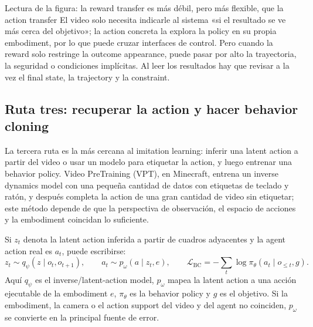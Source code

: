 
\begin{knowledgebox}{Lectura de la figura: la reward transfer es más débil, pero más flexible, que la action transfer}
El video solo necesita indicarle al sistema «si el resultado se ve más cerca del objetivo»; la action concreta la explora la policy en su propia embodiment, por lo que puede cruzar interfaces de control. Pero cuando la reward solo restringe la outcome appearance, puede pasar por alto la trayectoria, la seguridad o condiciones implícitas. Al leer los resultados hay que revisar a la vez el final state, la trajectory y la constraint.
\end{knowledgebox}

\subsection{Ruta tres: recuperar la action y hacer behavior cloning}

La tercera ruta es la más cercana al imitation learning: inferir una latent action a partir del video o usar un modelo para etiquetar la action, y luego entrenar una behavior policy. Video PreTraining (VPT), en Minecraft, entrena un inverse dynamics model con una pequeña cantidad de datos con etiquetas de teclado y ratón, y después completa la action de una gran cantidad de video sin etiquetar; este método depende de que la perspectiva de observación, el espacio de acciones y la embodiment coincidan lo suficiente.


Si $z_t$ denota la latent action inferida a partir de cuadros adyacentes y la agent action real es $a_t$, puede escribirse:
\[
z_t\sim q_\psi(z\mid o_t,o_{t+1}),\qquad
a_t\sim p_\omega(a\mid z_t,e),\qquad
\mathcal{L}_{\mathrm{BC}}=-\sum_t\log\pi_\theta(a_t\mid o_{\le t},g).
\]
Aquí $q_\psi$ es el inverse/latent-action model, $p_\omega$ mapea la latent action a una acción ejecutable de la embodiment $e$, $\pi_\theta$ es la behavior policy y $g$ es el objetivo. Si la embodiment, la camera o el action support del video y del agent no coinciden, $p_\omega$ se convierte en la principal fuente de error.

